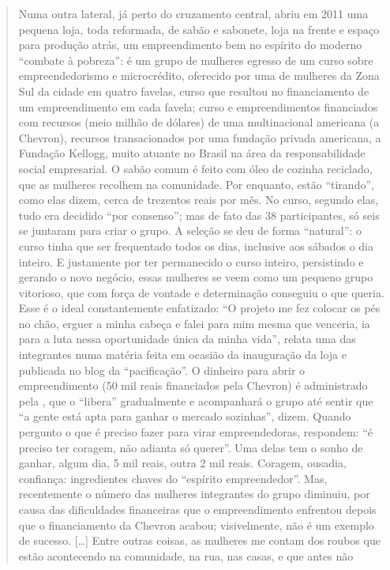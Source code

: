 \begin{quote}
Numa outra lateral, já perto do cruzamento central, abriu em 2011 uma
pequena loja, toda reformada, de sabão e sabonete, loja na frente e
espaço para produção atrás, um empreendimento bem no espírito do moderno
``combate à pobreza'': é um grupo de mulheres egresso de um curso sobre
empreendedorismo e microcrédito, oferecido por uma  de mulheres da
Zona Sul da cidade em quatro favelas, curso que resultou no
financiamento de um empreendimento em cada favela; curso e
empreendimentos financiados com recursos (meio milhão de dólares) de uma
multinacional americana (a Chevron), recursos transacionados por uma
fundação privada americana, a Fundação Kellogg, muito atuante no Brasil
na área da responsabilidade social empresarial. O sabão comum é feito
com óleo de cozinha reciclado, que as mulheres recolhem na comunidade.
Por enquanto, estão ``tirando'', como elas dizem, cerca de trezentos
reais por mês. No curso, segundo elas, tudo era decidido ``por
consenso''; mas de fato das 38 participantes, só seis se juntaram para
criar o grupo. A seleção se deu de forma ``natural'': o curso tinha que
ser frequentado todos os dias, inclusive aos sábados o dia inteiro. E
justamente por ter permanecido o curso inteiro, persistindo e gerando o
novo negócio, essas mulheres se veem como um pequeno grupo vitorioso,
que com força de vontade e determinação conseguiu o que queria. Esse é o
ideal constantemente enfatizado: ``O projeto me fez colocar os pés no
chão, erguer a minha cabeça e falei para mim mesma que venceria, ia para
a luta nessa oportunidade única da minha vida'', relata uma das
integrantes numa matéria feita em ocasião da inauguração da loja e
publicada no blog da ``pacificação''. O dinheiro para abrir o
empreendimento (50 mil reais financiados pela Chevron) é administrado
pela , que o ``libera'' gradualmente e acompanhará o grupo até sentir
que ``a gente está apta para ganhar o mercado sozinhas'', dizem. Quando
pergunto o que é preciso fazer para virar empreendedoras, respondem: ``é
preciso ter coragem, não adianta só querer''. Uma delas tem o sonho de
ganhar, algum dia, 5 mil reais, outra 2 mil reais. Coragem, ousadia,
confiança: ingredientes chaves do ``espírito empreendedor''. Mas,
recentemente o número das mulheres integrantes do grupo diminuiu, por
causa das dificuldades financeiras que o empreendimento enfrentou depois
que o financiamento da Chevron acabou; visivelmente, não é um exemplo de
sucesso. {[}\ldots{}{]} Entre outras coisas, as mulheres me contam dos roubos
que estão acontecendo na comunidade, na rua, nas casas, e que antes não

\end{quote}
